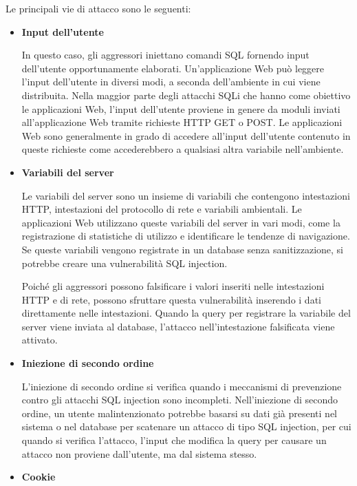 \singlespacing

Le principali vie di attacco sono le seguenti:

\begin{itemize}
    \item \textbf{Input dell'utente}
    
    In questo caso, gli aggressori iniettano comandi SQL fornendo input dell'utente opportunamente elaborati. Un'applicazione Web può leggere l'input dell'utente in diversi modi, a seconda dell'ambiente in cui viene distribuita. Nella maggior parte degli attacchi SQLi che hanno come obiettivo le applicazioni Web, l'input dell'utente proviene in genere da moduli inviati all'applicazione Web tramite richieste HTTP GET o POST. Le applicazioni Web sono generalmente in grado di accedere all'input dell'utente contenuto in queste richieste come accederebbero a qualsiasi altra variabile nell'ambiente. 
    
    \item \textbf{Variabili del server} 
    
    Le variabili del server sono un insieme di variabili che contengono intestazioni HTTP, intestazioni del protocollo di rete e variabili ambientali. Le applicazioni Web utilizzano queste variabili del server in vari modi, come la registrazione di statistiche di utilizzo e identificare le tendenze di navigazione. Se queste variabili vengono registrate in un database senza sanitizzazione, si potrebbe creare una vulnerabilità SQL injection.
    
    Poiché gli aggressori possono falsificare i valori inseriti nelle intestazioni HTTP e di rete, possono sfruttare questa vulnerabilità inserendo i dati direttamente nelle intestazioni. Quando la query per registrare la variabile del server viene inviata al database, l'attacco nell'intestazione falsificata viene attivato.
    
    \item \textbf{Iniezione di secondo ordine}
    
    L'iniezione di secondo ordine si verifica quando i meccanismi di prevenzione contro gli attacchi SQL injection sono incompleti. Nell'iniezione di secondo ordine, un utente malintenzionato potrebbe basarsi su dati già presenti nel sistema o nel database per scatenare un attacco di tipo SQL injection, per cui quando si verifica l'attacco, l'input che modifica la query per causare un attacco non proviene dall'utente, ma dal sistema stesso.
    
    \item \textbf{Cookie}
    

\end{itemize}
